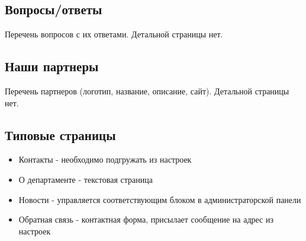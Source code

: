 \documentclass[DIV=calc, paper=a4, fontsize=11pt]{scrartcl} %
\begin{document}
\subsection{Вопросы/ответы}
Перечень вопросов с их ответами. Детальной страницы нет.

\subsection{Наши партнеры}
Перечень партнеров (логотип, название, описание, сайт). Детальной страницы нет.

\subsection{Типовые страницы}

\begin{itemize}
	\item Контакты - необходимо подгружать из настроек 
	\item О департаменте - текстовая страница
	\item Новости - управляется соответствующим блоком в администраторской панели
	\item Обратная связь - контактная форма, присылает сообщение на адрес из настроек
\end{itemize}
\end{document}
